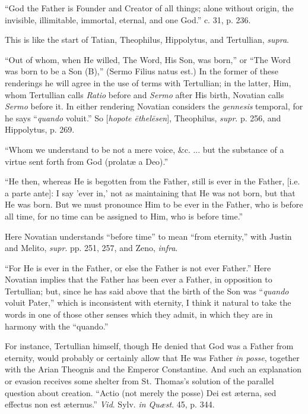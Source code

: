 ``God the Father is Founder and Creator of all things; alone
without origin, the invisible, illimitable, immortal, eternal, and one
God.'' c. 31, p. 236.

This is like the start of Tatian, Theophilus, Hippolytus, and
Tertullian, \emph{supra}.

``Out of whom, when He willed, The Word, His Son, was
born,'' or ``The Word was born to be a Son (B),'' (Sermo
Filius natus est.) In the former of these renderings he will agree in
the use of terms with Tertullian; in the latter, Him, whom Tertullian
calls \emph{Ratio} before and \emph{Sermo} after His birth, Novatian
calls \emph{Sermo} before it. In either rendering Novatian considers
the \emph{gennesis} temporal, for he says ``\emph{quando} voluit.''
So [\emph{hopote \={e}thel\={e}sen}], Theophilus, \emph{supr}.
p. 256, and Hippolytus, p. 269.

``Whom we understand to be not a mere voice, \&c. ... but
the substance of a virtue sent forth from God (prolatæ a Deo).''

``He then, whereas He is begotten from the Father, still is
ever in the Father, [i.e. a parte ante]: I say 'ever in,' not as
maintaining that He was not born, but that He was born. But we must
pronounce Him to be ever in the Father, who is before all time, for no
time can be assigned to Him, who is before time.''

Here Novatian understands ``before time'' to mean
``from eternity,'' with Justin and Melito, \emph{supr}. pp.
251, 257, and Zeno, \emph{infra}.

``For He is ever in the Father, or else the Father is not ever
Father.'' Here Novatian implies that the Father has been
ever a Father, in opposition to Tertullian; but, since he has said
above that the birth of the Son was ``\emph{quando} voluit Pater,''
which is inconsistent with eternity, I think it natural to take the
words in one of those other senses which they admit, in which they are
in harmony with the ``quando.''

For instance, Tertullian himself, though He denied that God was a
Father from eternity, would probably or certainly allow that He was
Father \emph{in posse}, together with the Arian Theognis and the
Emperor Constantine. And such an explanation or evasion receives some
shelter from St. Thomas's solution of the parallel question about
creation. ``Actio (not merely the posse) Dei est æterna, sed
effectus non est æternus.'' \emph{Vid}. Sylv. \emph{in Quæst}.
45, p. 344.

